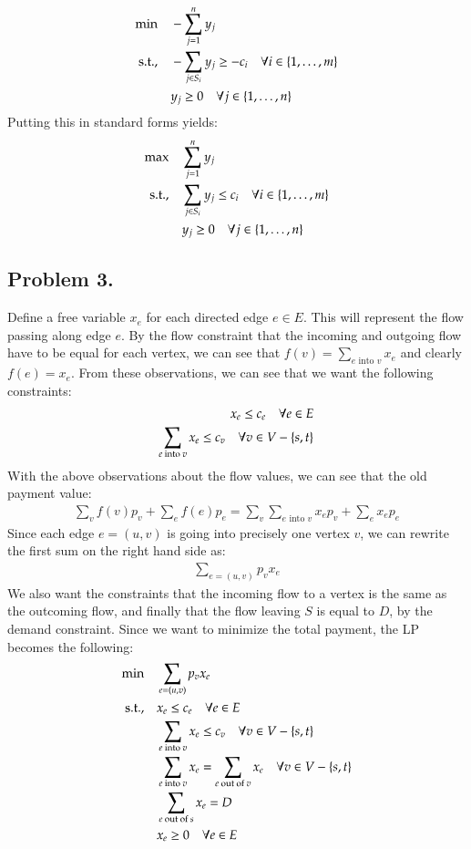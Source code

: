 \documentclass[12pt]{article}
\theoremstyle{definitionstyle}
\newcommand{\SET}[1]{\Set{\mskip-\medmuskip #1 \mskip-\medmuskip}}
\begin{document}
    \begin{align*}
        \min \quad &-\sum_{j=1}^n y_j \\
        \text{s.t.,} \quad &-\sum_{j \in S_i} y_j \geq -c_i \quad \forall i \in \SET{1, \ldots, m} \\
        &y_j \geq 0 \quad \forall j \in \SET{1, \ldots, n}
    \end{align*}
    Putting this in standard forms yields:
    \begin{align*}
        \max \quad &\sum_{j=1}^n y_j \\
        \text{s.t.,} \quad &\sum_{j \in S_i} y_j \leq c_i \quad \forall i \in \SET{1, \ldots, m} \\
        &y_j \geq 0 \quad \forall j \in \SET{1, \ldots, n}
    \end{align*}



    \subsection*{Problem 3.}
    Define a free variable $x_e$ for each directed edge $e \in E$. This will represent the flow passing along edge $e$. By the flow constraint that the incoming and outgoing flow have to be equal for each vertex, we can see that $f(v) = \sum_{e \text{ into } v} x_e$ and clearly $f(e) = x_e$. From these observations, we can see that we want the following constraints:
    \begin{align*}
        x_e \leq c_e \quad \forall e \in E \\
        \sum_{e \text{ into } v} x_e \leq c_v \quad \forall v \in V - \SET{s, t}
    \end{align*}
    With the above observations about the flow values, we can see that the old payment value:
    \begin{align*}
        \sum_v f(v)p_v + \sum_e f(e)p_e = \sum_v \sum_{e \text{ into } v} x_ep_v + \sum_e x_ep_e
    \end{align*}
    Since each edge $e = (u,v)$ is going into precisely one vertex $v$, we can rewrite the first sum on the right hand side as:
    \begin{align*}
        \sum_{e = (u,v)} p_vx_e
    \end{align*}
    We also want the constraints that the incoming flow to a vertex is the same as the outcoming flow, and finally that the flow leaving $S$ is equal to $D$, by the demand constraint. Since we want to minimize the total payment, the LP becomes the following:
    \begin{align*}
        \min \quad &\sum_{e = (u,v)} p_vx_e \\
        \text{s.t.,} \quad &x_e \leq c_e \quad \forall e \in E \\
        &\sum_{e \text{ into } v} x_e \leq c_v \quad \forall v \in V - \SET{s, t} \\
        &\sum_{e \text{ into } v} x_e = \sum_{e \text{ out of } v} x_e \quad \forall v \in V - \SET{s, t}\\
        &\sum_{e \text{ out of } s} x_e = D \\
        &x_e \geq 0 \quad \forall e \in E
    \end{align*}
    
\end{document}
